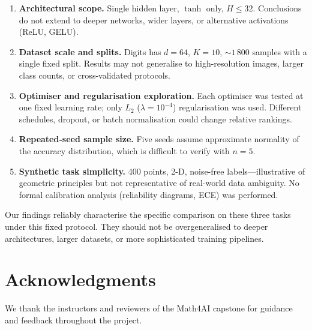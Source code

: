 \documentclass[sigconf,screen,nonacm]{acmart}
\newcommand{\1}{\mathbf{1}}
\begin{document}
\begin{enumerate}[leftmargin=*]
  \item \textbf{Architectural scope.}  Single hidden layer, $\tanh$ only,
        $H\leq 32$.  Conclusions do not extend to deeper networks, wider
        layers, or alternative activations (ReLU, GELU).

  \item \textbf{Dataset scale and splits.}  Digits has $d{=}64$, $K{=}10$,
        ${\sim}1\,800$ samples with a single fixed split.  Results may not
        generalise to high-resolution images, larger class counts, or
        cross-validated protocols.

  \item \textbf{Optimiser and regularisation exploration.}  Each optimiser was
        tested at one fixed learning rate; only $L_2$ ($\lambda{=}10^{-4}$)
        regularisation was used.  Different schedules, dropout, or batch
        normalisation could change relative rankings.

  \item \textbf{Repeated-seed sample size.}  Five seeds assume approximate
        normality of the accuracy distribution, which is difficult to verify
        with $n{=}5$.

  \item \textbf{Synthetic task simplicity.}  400 points, 2-D, noise-free
        labels---illustrative of geometric principles but not representative
        of real-world data ambiguity.  No formal calibration analysis
        (reliability diagrams, ECE) was performed.
\end{enumerate}

Our findings reliably characterise the specific comparison on these three tasks
under this fixed protocol.  They should not be overgeneralised to deeper
architectures, larger datasets, or more sophisticated training pipelines.

\vspace{-0.3cm}
\section*{Acknowledgments}
We thank the instructors and reviewers of the Math4AI capstone for guidance
and feedback throughout the project.
\vspace{-0.5cm}
\setlength{\bibsep}{5pt}
\nocite{*}


\end{document}
